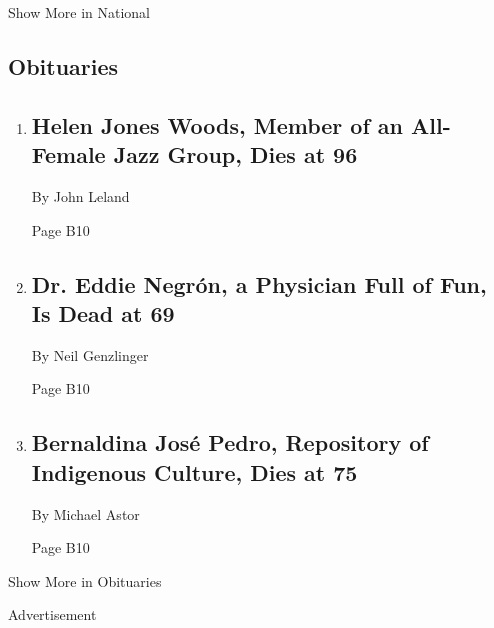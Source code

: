 Show More in National

\hypertarget{obituaries}{%
\subsection{Obituaries}\label{obituaries}}

\begin{enumerate}
\def\labelenumi{\arabic{enumi}.}
\item
  \href{/2020/08/04/obituaries/Helen-Woods-dead-coronavirus.html}{}

  \hypertarget{helen-jones-woods-member-of-an-all-female-jazz-group-dies-at-96}{%
  \subsection{Helen Jones Woods, Member of an All-Female Jazz Group,
  Dies at
  96}\label{helen-jones-woods-member-of-an-all-female-jazz-group-dies-at-96}}

  By John Leland

  Page B10
\item
  \href{/2020/08/01/obituaries/eddie-negron-dead-coronavirus.html}{}

  \hypertarget{dr-eddie-negruxf3n-a-physician-full-of-fun-is-dead-at-69}{%
  \subsection{Dr. Eddie Negrón, a Physician Full of Fun, Is Dead at
  69}\label{dr-eddie-negruxf3n-a-physician-full-of-fun-is-dead-at-69}}

  By Neil Genzlinger

  Page B10
\item
  \href{/2020/08/03/obituaries/bernaldina-jose-pedro-dead-coronavirus.html}{}

  \hypertarget{bernaldina-josuxe9-pedro-repository-of-indigenous-culture-dies-at-75}{%
  \subsection{Bernaldina José Pedro, Repository of Indigenous Culture,
  Dies at
  75}\label{bernaldina-josuxe9-pedro-repository-of-indigenous-culture-dies-at-75}}

  By Michael Astor

  Page B10
\end{enumerate}

Show More in Obituaries

Advertisement

